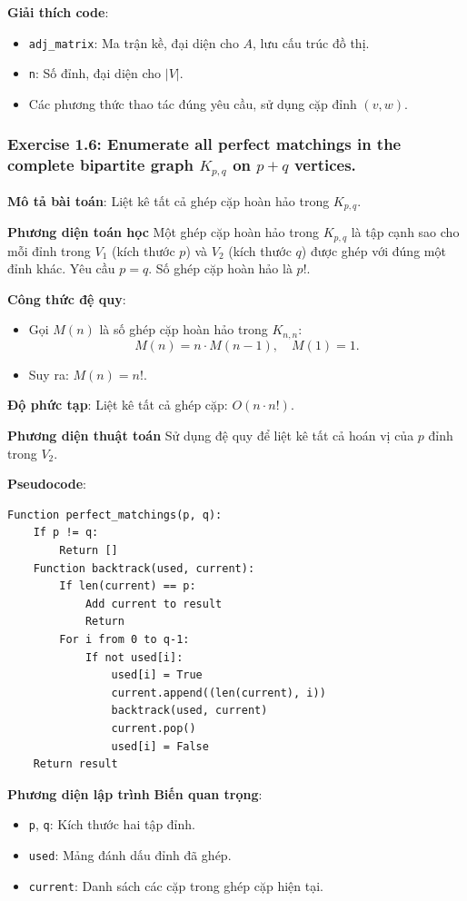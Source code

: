 \documentclass[a4paper,12pt]{article}
\begin{document}
\bigskip
\textbf{Giải thích code}:
\begin{itemize}
    \item \texttt{adj\_matrix}: Ma trận kề, đại diện cho \(A\), lưu cấu trúc đồ thị.
    \item \texttt{n}: Số đỉnh, đại diện cho \(\lvert V\rvert\).
    \item Các phương thức thao tác đúng yêu cầu, sử dụng cặp đỉnh \((v,w)\).
\end{itemize}


\subsubsection{Exercise 1.6: Enumerate all perfect matchings in the complete bipartite graph $K_{p,q}$ on $p + q$ vertices.}
\textbf{Mô tả bài toán}: Liệt kê tất cả ghép cặp hoàn hảo trong \( K_{p,q} \).

\textbf{Phương diện toán học}
Một ghép cặp hoàn hảo trong \( K_{p,q} \) là tập cạnh sao cho mỗi đỉnh trong \( V_1 \) (kích thước \( p \)) và \( V_2 \) (kích thước \( q \)) được ghép với đúng một đỉnh khác. Yêu cầu \( p = q \). Số ghép cặp hoàn hảo là \( p! \).

\textbf{Công thức đệ quy}:
\begin{itemize}
    \item Gọi \( M(n) \) là số ghép cặp hoàn hảo trong \( K_{n,n} \):
    \[
    M(n) = n \cdot M(n-1), \quad M(1) = 1.
    \]
    \item Suy ra: \( M(n) = n! \).
\end{itemize}

\textbf{Độ phức tạp}: Liệt kê tất cả ghép cặp: \( O(n \cdot n!) \).

\textbf{Phương diện thuật toán}
Sử dụng đệ quy để liệt kê tất cả hoán vị của \( p \) đỉnh trong \( V_2 \).

\textbf{Pseudocode}:
\begin{verbatim}
Function perfect_matchings(p, q):
    If p != q:
        Return []
    Function backtrack(used, current):
        If len(current) == p:
            Add current to result
            Return
        For i from 0 to q-1:
            If not used[i]:
                used[i] = True
                current.append((len(current), i))
                backtrack(used, current)
                current.pop()
                used[i] = False
    Return result
\end{verbatim}

\textbf{Phương diện lập trình}
\textbf{Biến quan trọng}:
\begin{itemize}
    \item \texttt{p}, \texttt{q}: Kích thước hai tập đỉnh.
    \item \texttt{used}: Mảng đánh dấu đỉnh đã ghép.
    \item \texttt{current}: Danh sách các cặp trong ghép cặp hiện tại.
\end{itemize}
\end{document}
